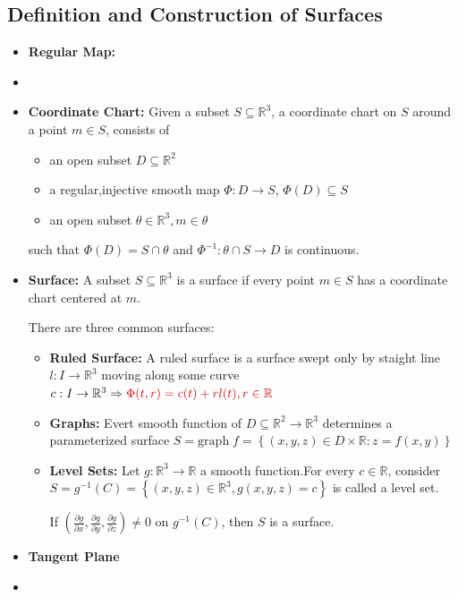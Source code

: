 \documentclass[a4paper,12pt]{article}
\newcommand{\key}[1]{\textcolor{keywordcolor}{\textbf{#1}}}
\newcommand{\formula}[1]{\textcolor{formulacolor}{#1}}
\begin{document}
\subsection{Definition and Construction of Surfaces}
\begin{itemize}
    \item \key{Regular Map:}
    \item \key{ }
    \item \key{Coordinate Chart:} Given a subset $S\subseteq \mathbb{R}^3$, a coordinate chart on $S$ around a point $m\in S$, consists of
    \begin{itemize}
        \item an open subset $D\subseteq\mathbb{R}^2$
        \item a regular,injective smooth map $\Phi:D\to S$, $\Phi(D)\subseteq S$
        \item an open subset $\theta\in\mathbb{R}^3,m\in\theta$
    \end{itemize}
    such that $\Phi(D)=S\cap \theta$ and $\Phi^{-1}:\theta\cap S\to D$ is continuous.
    \item \key{Surface:} A subset $S\subseteq \mathbb{R}^3$ is a surface if every point $m\in S$ has a coordinate chart centered at $m$.\par
    There are three common surfaces:
    \begin{itemize}
        \item \key{Ruled Surface:} A ruled surface is a surface swept only by staight line $l:I\to\mathbb{R}^3$ moving along some curve $c:I\to\mathbb{R}^3\Rightarrow \formula{\Phi(t,r)=c(t)+r l(t),r\in\mathbb{R}}$ 
        \item \key{Graphs:} Evert smooth function of $D\subseteq\mathbb{R}^2\to\mathbb{R}^3$ determines a parameterized surface \formula{$S=\mathrm{graph}\;f=\left\{(x,y,z)\in D\times\mathbb{R}:z=f(x,y)\right\}$}
        \item \key{Level Sets:} Let $g:\mathbb{R}^3\to\mathbb{R}$ a smooth function.For every $c\in\mathbb{R}$, consider \formula{$S=g^{-1}(C)=\left\{(x,y,z)\in\mathbb{R}^3,g(x,y,z)=c\right\}$} is called a level set.\par
        If $\left(\frac{\partial g}{\partial x},\frac{\partial g}{\partial y},\frac{\partial g}{\partial z}\right) \neq 0$ on $g^{-1}(C)$, then $S$ is a surface.
    \end{itemize}
    \item \key{Tangent Plane}
    \item \key{}
\end{itemize}
\end{document}
